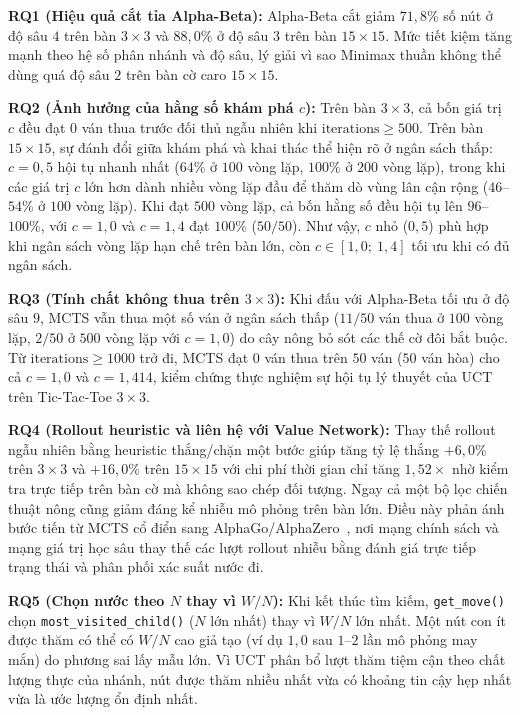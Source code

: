 \documentclass[conference]{IEEEtran}
\begin{document}
\textbf{RQ1 (Hiệu quả cắt tỉa Alpha-Beta):} Alpha-Beta cắt giảm $71{,}8\%$ số nút ở độ sâu $4$ trên bàn $3\times 3$ và $88{,}0\%$ ở độ sâu $3$ trên bàn $15\times 15$. Mức tiết kiệm tăng mạnh theo hệ số phân nhánh và độ sâu, lý giải vì sao Minimax thuần không thể dùng quá độ sâu $2$ trên bàn cờ caro $15\times 15$.

\textbf{RQ2 (Ảnh hưởng của hằng số khám phá $c$):} Trên bàn $3\times 3$, cả bốn giá trị $c$ đều đạt $0$ ván thua trước đối thủ ngẫu nhiên khi $\text{iterations} \ge 500$. Trên bàn $15\times 15$, sự đánh đổi giữa khám phá và khai thác thể hiện rõ ở ngân sách thấp: $c = 0{,}5$ hội tụ nhanh nhất ($64\%$ ở $100$ vòng lặp, $100\%$ ở $200$ vòng lặp), trong khi các giá trị $c$ lớn hơn dành nhiều vòng lặp đầu để thăm dò vùng lân cận rộng ($46$--$54\%$ ở $100$ vòng lặp). Khi đạt $500$ vòng lặp, cả bốn hằng số đều hội tụ lên $96$--$100\%$, với $c = 1{,}0$ và $c = 1{,}4$ đạt $100\%$ ($50/50$). Như vậy, $c$ nhỏ ($0{,}5$) phù hợp khi ngân sách vòng lặp hạn chế trên bàn lớn, còn $c \in [1{,}0;\ 1{,}4]$ tối ưu khi có đủ ngân sách.

\textbf{RQ3 (Tính chất không thua trên $3\times 3$):} Khi đấu với Alpha-Beta tối ưu ở độ sâu $9$, MCTS vẫn thua một số ván ở ngân sách thấp ($11/50$ ván thua ở $100$ vòng lặp, $2/50$ ở $500$ vòng lặp với $c = 1{,}0$) do cây nông bỏ sót các thế cờ đôi bắt buộc. Từ $\text{iterations} \ge 1000$ trở đi, MCTS đạt $0$ ván thua trên $50$ ván ($50$ ván hòa) cho cả $c = 1{,}0$ và $c = 1{,}414$, kiểm chứng thực nghiệm sự hội tụ lý thuyết của UCT trên Tic-Tac-Toe $3\times 3$.

\textbf{RQ4 (Rollout heuristic và liên hệ với Value Network):} Thay thế rollout ngẫu nhiên bằng heuristic thắng/chặn một bước giúp tăng tỷ lệ thắng $+6{,}0\%$ trên $3\times 3$ và $+16{,}0\%$ trên $15\times 15$ với chi phí thời gian chỉ tăng $1{,}52\times$ nhờ kiểm tra trực tiếp trên bàn cờ mà không sao chép đối tượng. Ngay cả một bộ lọc chiến thuật nông cũng giảm đáng kể nhiễu mô phỏng trên bàn lớn. Điều này phản ánh bước tiến từ MCTS cổ điển sang AlphaGo/AlphaZero~\cite{silver2016}, nơi mạng chính sách và mạng giá trị học sâu thay thế các lượt rollout nhiễu bằng đánh giá trực tiếp trạng thái và phân phối xác suất nước đi.

\textbf{RQ5 (Chọn nước theo $N$ thay vì $W/N$):} Khi kết thúc tìm kiếm, \texttt{get\_move()} chọn \texttt{most\_visited\_child()} ($N$ lớn nhất) thay vì $W/N$ lớn nhất. Một nút con ít được thăm có thể có $W/N$ cao giả tạo (ví dụ $1{,}0$ sau $1$--$2$ lần mô phỏng may mắn) do phương sai lấy mẫu lớn. Vì UCT phân bổ lượt thăm tiệm cận theo chất lượng thực của nhánh, nút được thăm nhiều nhất vừa có khoảng tin cậy hẹp nhất vừa là ước lượng ổn định nhất.
\end{document}
